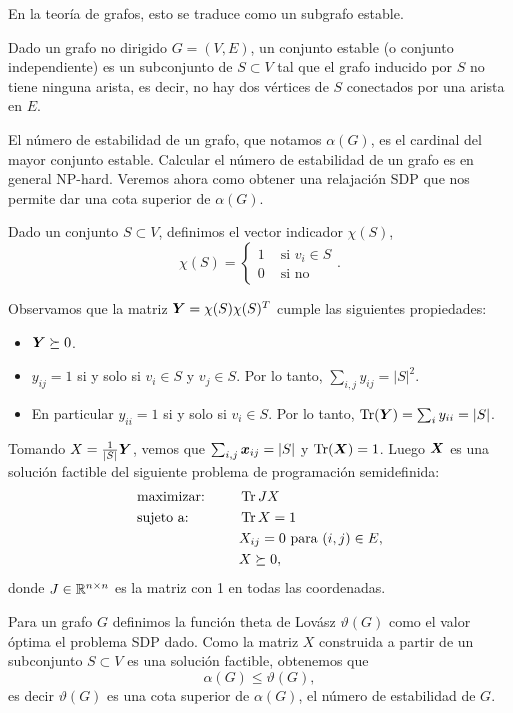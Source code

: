 En la teor\'ia de grafos, esto se traduce como un subgrafo estable.

Dado un grafo no dirigido $G = (V, E)$, un conjunto estable (o conjunto independiente) es un subconjunto de $S \subset V$ tal que el grafo inducido por $S$ no tiene ninguna arista, es decir, no hay dos vértices de $S$ conectados por una arista en $E$.

El número de estabilidad de un grafo, que notamos $\alpha(G)$, es el cardinal del mayor conjunto estable. Calcular el número de estabilidad de un grafo es en general NP-hard. Veremos ahora como obtener una relajación SDP que nos permite dar una cota superior de $\alpha(G)$.

Dado un conjunto $S \subset V$, definimos el vector indicador $\chi(S)$,
$$
\chi(S) = \begin{cases}
1 &\text{ si } v_i \in S \\
0 &\text{ si no}
\end{cases}.
$$

Observamos que la matriz $\bm{Y} = \chi(S) \chi(S)^T$ cumple las siguientes propiedades:
\begin{itemize}
\item $\bm{Y} \succeq 0$.
\item $y_{ij} = 1$ si y solo si $v_i \in S$ y $v_j \in S$. Por lo tanto, $\sum_{i,j} y_{ij} = |S|^2$.
\item En particular $y_{ii} = 1$ si y solo si $v_i \in S$. Por lo tanto, $\operatorname{Tr}(\bm{Y}) = \sum_{i} y_{ii} = |S|$.
\end{itemize}

Tomando $X = \frac{1}{|S|} \bm{Y}$, vemos que $\sum_{i,j} \bm{x}_{ij} = |S|$ y $\operatorname{Tr}(\bm{X}) = 1$. Luego $\bm{X}$ es una solución factible del siguiente problema de programación semidefinida:
\begin{alignat*}{2}
  & \text{maximizar: } & & \operatorname{Tr} JX \\
   & \text{sujeto a: } & \quad & \operatorname{Tr} X = 1 \\
   & & & X_{ij} = 0 \text{ para } (i,j) \in E, \\
   & & & X \succeq 0,
\end{alignat*}
donde $J \in \mathbb{R}^{n \times n}$ es la matriz con 1 en todas las coordenadas.

Para un grafo $G$ definimos la función theta de Lovász $\vartheta(G)$ como el valor óptima el problema SDP dado.
Como la matriz $X$ construida a partir de un subconjunto $S \subset V$ es una solución factible, obtenemos que
$$ \alpha(G) \le \vartheta(G),$$
es decir $\vartheta(G)$ es una cota superior de $\alpha(G)$, el número de estabilidad de $G$.
